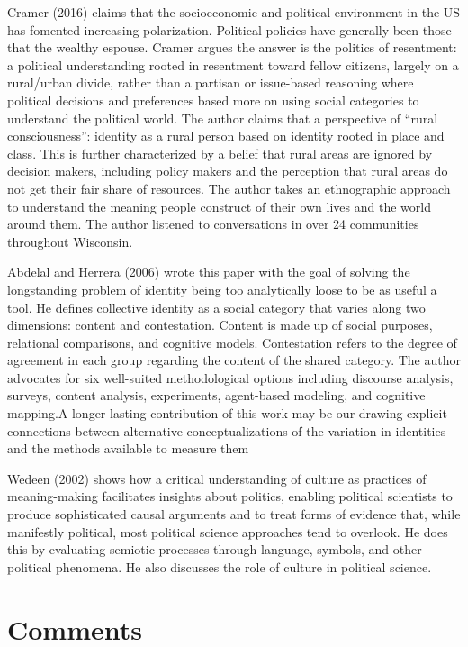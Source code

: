 \documentclass[
  english,
  man]{apa6}
\begin{document}
Cramer (2016) claims that the socioeconomic and political environment in the US has fomented increasing polarization. Political policies have generally been those that the wealthy espouse. Cramer argues the answer is the politics of resentment: a political understanding rooted in resentment toward fellow citizens, largely on a rural/urban divide, rather than a partisan or issue-based reasoning where political decisions and preferences based more on using social categories to understand the political world. The author claims that a perspective of \enquote{rural consciousness}: identity as a rural person based on identity rooted in place and class. This is further characterized by a belief that rural areas are ignored by decision makers, including policy makers and the perception that rural areas do not get their fair share of resources. The author takes an ethnographic approach to understand the meaning people construct of their own lives and the world around them. The author listened to conversations in over 24 communities throughout Wisconsin.

Abdelal and Herrera (2006) wrote this paper with the goal of solving the longstanding problem of identity being too analytically loose to be as useful a tool. He defines collective identity as a social category that varies along two dimensions: content and contestation. Content is made up of social purposes, relational comparisons, and cognitive models. Contestation refers to the degree of agreement in each group regarding the content of the shared category. The author advocates for six well-suited methodological options including discourse analysis, surveys, content analysis, experiments, agent-based modeling, and cognitive mapping.A longer-lasting contribution of this work may be our drawing explicit connections between alternative conceptualizations of the variation in identities and the methods available to measure them

Wedeen (2002) shows how a critical understanding of culture as practices of meaning-making facilitates insights about politics, enabling political scientists to produce sophisticated causal arguments and to treat forms of evidence that, while manifestly political, most political science approaches tend to overlook. He does this by evaluating semiotic processes through language, symbols, and other political phenomena. He also discusses the role of culture in political science.

\hypertarget{comments}{%
\section{Comments}\label{comments}}
\end{document}
